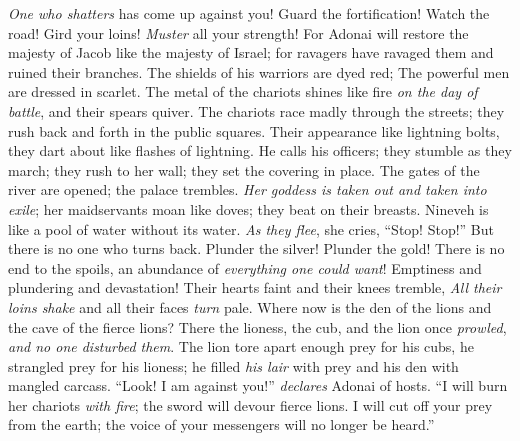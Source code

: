 \begin{biblechapter} %
 \textit{One who shatters} has come up against you! 
Guard the fortification! 
Watch the road! 
Gird your loins! 
\textit{Muster} all your strength!
\verse For Adonai will restore the majesty of Jacob 
like the majesty of Israel; 
for ravagers have ravaged them 
and ruined their branches.
 The shields of his warriors are dyed red; 
The powerful men are dressed in scarlet. 
The metal of the chariots shines like fire \textit{on the day of battle}, 
and their spears quiver.
\verse The chariots race madly through the streets; 
they rush back and forth in the public squares. 
Their appearance like lightning bolts, 
they dart about like flashes of lightning.
\verse He calls his officers; 
they stumble as they march; 
they rush to her wall; 
they set the covering in place.
\verse The gates of the river are opened; 
the palace trembles.
\verse \textit{Her goddess is taken out and taken into exile}; 
her maidservants moan like doves; 
they beat on their breasts.
\verse Nineveh is like a pool of water without its water. 
\textit{As they flee}, she cries, “Stop! Stop!” 
But there is no one who turns back.
\verse Plunder the silver! Plunder the gold! 
There is no end to the spoils, 
an abundance of \textit{everything one could want}!
\verse Emptiness and plundering and devastation! 
Their hearts faint and their knees tremble, 
\textit{All their loins shake} and all their faces \textit{turn} pale.
 Where now is the den of the lions 
and the cave of the fierce lions? 
There the lioness, the cub, and the lion once \textit{prowled}, 
\textit{and no one disturbed them}.
\verse The lion tore apart enough prey for his cubs, 
he strangled prey for his lioness; 
he filled \textit{his lair} with prey 
and his den with mangled carcass.
\verse “Look! I am against you!” \textit{declares} Adonai of hosts. 
“I will burn her chariots \textit{with fire}; 
the sword will devour fierce lions. 
I will cut off your prey from the earth; 
the voice of your messengers will no longer be heard.”
\end{biblechapter}

